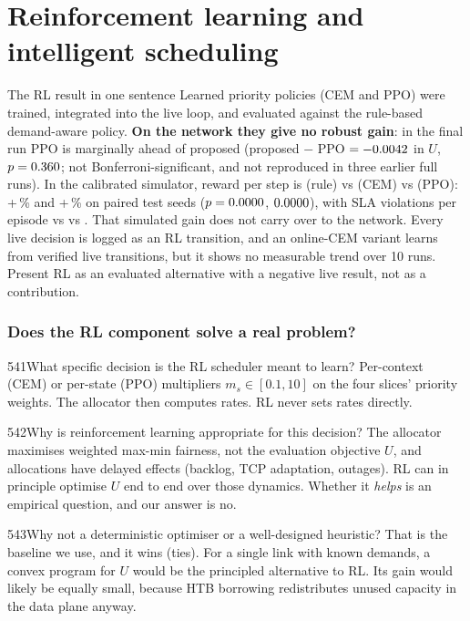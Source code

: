 \part{Reinforcement learning and intelligent scheduling}

\begin{warnbox}{The RL result in one sentence}
Learned priority policies (CEM and PPO) were trained, integrated into the live loop, and evaluated against the
rule-based demand-aware policy. \textbf{On the network they give no robust gain}: in the final run PPO is marginally ahead
of proposed (proposed $-$ PPO $=-0.0042$ in $U$, $p=0.360$; not Bonferroni-significant, and not reproduced in three earlier full
runs). In the calibrated simulator, reward per step is \NSeqRuleReward{} (rule) vs
\NSeqCemReward{} (CEM) vs \NSeqPpoReward{} (PPO): +\NSeqCemRel\,\% and +\NSeqPpoRel\,\% on paired test seeds
($p=0.0000$, $0.0000$), with SLA violations per episode \NSeqRuleViol{} vs \NSeqCemViol{} vs
\NSeqPpoViol. That simulated gain does not carry over to the network. Every live decision is logged as an RL transition, and an online-CEM
variant learns from verified live transitions, but it shows no measurable trend over 10 runs. Present RL as an
evaluated alternative with a negative live result, not as a contribution.
\end{warnbox}

\section{Does the RL component solve a real problem?}

\begin{qa}{541}{What specific decision is the RL scheduler meant to learn?}
Per-context (CEM) or per-state (PPO) multipliers $m_s\in[0.1,10]$ on the four slices' priority weights. The allocator
then computes rates. RL never sets rates directly.
\end{qa}

\begin{qa}{542}{Why is reinforcement learning appropriate for this decision?}
The allocator maximises weighted max-min fairness, not the evaluation objective $U$, and allocations have delayed
effects (backlog, TCP adaptation, outages). RL can in principle optimise $U$ end to end over those dynamics.
Whether it \emph{helps} is an empirical question, and our answer is no.
\end{qa}

\begin{qa}{543}{Why not a deterministic optimiser or a well-designed heuristic?}
That is the baseline we use, and it wins (ties). For a single link with known demands, a convex program for $U$ would
be the principled alternative to RL. Its gain would likely be equally small, because HTB borrowing redistributes
unused capacity in the data plane anyway.
\end{qa}

